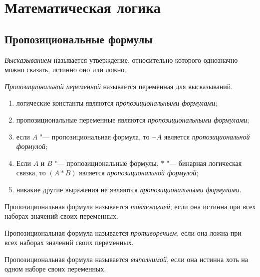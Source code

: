 \chapter{Математическая логика}

\section{Пропозициональные формулы}

\begin{definition}
	\emph{Высказыванием} называется утверждение, относительно которого однозначно можно сказать, истинно оно или ложно.
\end{definition}

\begin{definition}
	\emph{Пропозициональной переменной} называется переменная для высказываний.
\end{definition}

\begin{definition}
	\hfill
	\begin{enumerate}
		\item логические константы являются \emph{пропозициональными формулами};
		\item пропозициональные переменные являются \emph{пропозициональными формулами};
		\item если $ A $ "--- пропозициональная формула, то $ \neg A $ является \emph{пропозициональной формулой};
		\item Если $ A $ и $ B $ "--- пропозициональные формулы, $ * $ "--- бинарная логическая связка, то $ (A * B) $ является \emph{пропозициональной формулой};
		\item никакие другие выражения не являются \emph{пропозициональными формулами}.
	\end{enumerate}
\end{definition}

\begin{definition}
	Пропозициональная формула называется \emph{тавтологией}, если она истинна при всех наборах значений своих переменных.
\end{definition}

\begin{definition}
	Пропозициональная формула называется \emph{противоречием}, если она ложна при всех наборах значений своих переменных.
\end{definition}

\begin{definition}
	Пропозициональная формула называется \emph{выполнимой}, если она истинна хоть на одном наборе своих переменных.
\end{definition}

